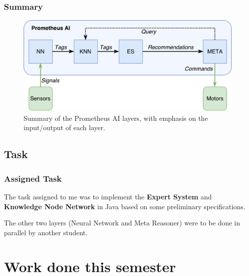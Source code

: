 \documentclass{beamer}
\begin{document}
	\begin{frame}
		\frametitle{Summary}
		\begin{figure}
			\centering
			\includegraphics[width=\textwidth]{figures/ai_model_labeled.pdf}
			\caption
			{Summary of the Prometheus AI layers, with emphasis on the input/output of each layer.}
			\label{fig:summary}
		\end{figure}
	\end{frame}

	\subsection{Task}
	
	\begin{frame}
		\frametitle{Assigned Task}
		The task assigned to me was to implement the \textbf{Expert System} and \textbf{Knowledge Node Network} in Java based on some preliminary specifications.
		\linebreak
		
		The other two layers (Neural Network and Meta Reasoner) were to be done in parallel by another student.
	\end{frame}
	
	\section[This semester]{Work done this semester}
	
%	
%	
	
\end{document}

